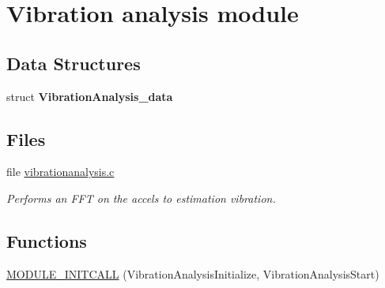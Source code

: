 \hypertarget{group___vibration_analysis_module}{\section{\-Vibration analysis module}
\label{group___vibration_analysis_module}
}
\subsection*{\-Data \-Structures}
\begin{DoxyCompactItemize}
\item 
struct {\bfseries \-Vibration\-Analysis\-\_\-data}
\end{DoxyCompactItemize}
\subsection*{\-Files}
\begin{DoxyCompactItemize}
\item 
file \hyperlink{vibrationanalysis_8c}{vibrationanalysis.\-c}
\begin{DoxyCompactList}\small\item\em \-Performs an \-F\-F\-T on the accels to estimation vibration. \end{DoxyCompactList}\end{DoxyCompactItemize}
\subsection*{\-Functions}
\begin{DoxyCompactItemize}
\item 
\hyperlink{group___vibration_analysis_module_ga9e7e6a96f3ed454bc4e05c84c5b7c5d1}{\-M\-O\-D\-U\-L\-E\-\_\-\-I\-N\-I\-T\-C\-A\-L\-L} (\-Vibration\-Analysis\-Initialize, \-Vibration\-Analysis\-Start)
\end{DoxyCompactItemize}


